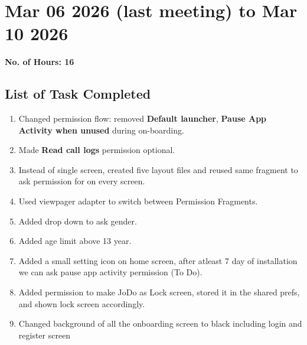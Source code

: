 \documentclass[12pt]{article}
\begin{document}
    \section{Mar 06 2026 (last meeting) to Mar 10 2026}
    {\bf No. of Hours: 16}
    \subsection{List of Task Completed}
    \begin{enumerate}
        \item Changed permission flow: removed \textbf{Default launcher}, \textbf{Pause App Activity when unused} during on-boarding.
        \item Made \textbf{Read call logs} permission optional.
        \item Instead of single screen, created five layout files and reused same fragment to ask permission for on every screen.
        \item Used viewpager adapter to switch between Permission Fragments.
        \item Added drop down to ask gender.
        \item Added age limit above 13 year.
        \item Added a small setting icon on home screen, after atleast 7 day of installation we can ask pause app activity permission (To Do).
    
        \item Added permission to make JoDo as Lock screen, stored it in the shared prefs, and shown lock screen accordingly.
        \item Changed background of all the onboarding screen to black including login and register screen 
        
    \end{enumerate}
\end{document}
